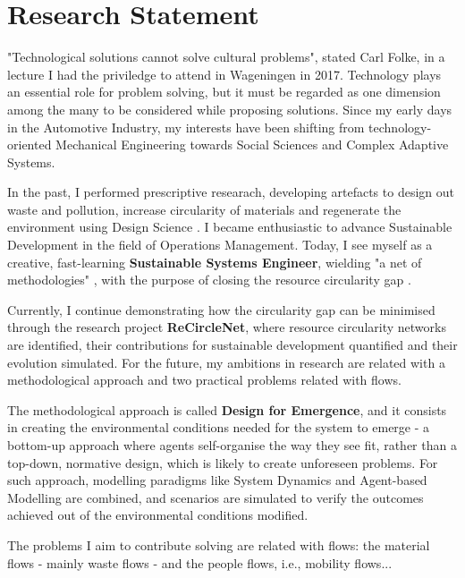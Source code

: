 \section*{Research Statement}
\vspace{-8pt}


"Technological solutions cannot solve cultural problems", stated Carl Folke, in a lecture I had the priviledge to attend in Wageningen in 2017. Technology plays an essential role for problem solving, but it must be regarded as one dimension among the many to be considered while proposing solutions. Since my early days in the Automotive Industry, my interests have been shifting from technology-oriented Mechanical Engineering towards Social Sciences and Complex Adaptive Systems. 


In the past, I performed prescriptive researach, developing artefacts to design out waste and pollution, increase circularity of materials and regenerate the environment \cite{EllenMacArthurFoundation2015} using Design Science \cite{VanAken2004,Peffers2007a}. I became enthusiastic to advance Sustainable Development in the field of Operations Management. Today, I see myself as a creative, fast-learning \textbf{Sustainable Systems Engineer}, wielding "a net of methodologies" \cite{self1978}, with the purpose of closing the resource circularity gap \cite{CircleEconomy2020b}. 


Currently, I continue demonstrating how the circularity gap can be minimised through the research project \textbf{ReCircleNet}, where resource circularity networks are identified, their contributions for sustainable development quantified and their evolution  simulated. For the future, my ambitions in research are related with a methodological approach and two practical problems related with flows.  

The methodological approach is called \textbf{Design for Emergence}, and it consists in creating the environmental conditions needed for the system to emerge - a bottom-up approach where agents self-organise the way they see fit, rather than a top-down, normative design, which is likely to create unforeseen problems. For such approach, modelling paradigms like System Dynamics and Agent-based Modelling are combined, and scenarios are simulated to verify the outcomes achieved out of the environmental conditions modified.

The problems I aim to contribute solving are related with flows: the material flows - mainly waste flows - and the people flows, i.e., mobility flows...
